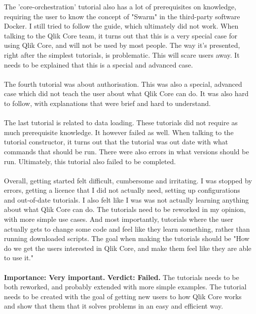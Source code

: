 \documentclass{cslthse-msc}
\begin{document}
    The 'core-orchestration' tutorial also has a lot of prerequisites on knowledge, requiring the user to know the concept of "Swarm" in the third-party software Docker. I still tried to follow the guide, which ultimately did not work. When talking to the Qlik Core team, it turns out that this is a very special case for using Qlik Core, and will not be used by most people. The way it's presented, right after the simplest tutorials, is problematic. This will scare users away. It needs to be explained that this is a special and advanced case. \\\\
    The fourth tutorial was about authorisation. This was also a special, advanced case which did not teach the user about what Qlik Core can do. It was also hard to follow, with explanations that were brief and hard to understand.\\\\
    The last tutorial is related to data loading. These tutorials did not require as much prerequisite knowledge. It however failed as well. When talking to the tutorial constructor, it turns out that the tutorial was out date with what commands that should be run. There were also errors in what versions should be run. Ultimately, this tutorial also failed to be completed.\\\\
    Overall, getting started felt difficult, cumbersome and irritating. I was stopped by errors, getting a licence that I did not actually need, setting up configurations and out-of-date tutorials. I also felt like I was was not actually learning anything about what Qlik Core can do. The tutorials need to be reworked in my opinion, with more simple use cases. And most importantly, tutorials where the user actually gets to change some code and feel like they learn something, rather than running downloaded scripts. The goal when making the tutorials should be "How do we get the users interested in Qlik Core, and make them feel like they are able to use it."\\\\
    \textbf{Importance: Very important.}
    \textbf{Verdict: Failed.} The tutorials needs to be both reworked, and probably extended with more simple examples. The tutorial needs to be created with the goal of getting new users to  how Qlik Core works and show that them that it solves problems in an easy and efficient way.
\end{document}
